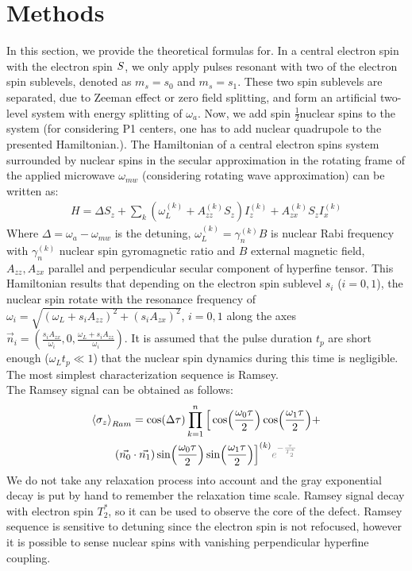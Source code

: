 \documentclass[%
 reprint,
superscriptaddress,
 amsmath,amssymb,
 aps,
]{revtex4-2}
\begin{document}
\section{Methods}
\label{sec:theory}
In this section, we provide the theoretical formulas for. In a central electron spin with the electron spin $\boldmath{S}$, we only apply pulses resonant with two of the electron spin sublevels, denoted as $m_s=s_0$ and $m_s = s_1$. These two spin sublevels are separated, due to Zeeman effect or zero field splitting, and form an artificial two-level system with energy splitting of $\omega_a$. Now, we add spin $\frac{1}{2}$nuclear spins to the system (for considering P1 centers, one has to add nuclear quadrupole to the presented Hamiltonian.). The Hamiltonian of a central electron spins system surrounded by nuclear spins in the secular approximation in the rotating frame of the applied microwave $\omega_{mw}$ (considering rotating wave approximation) can be written as:
\begin{align}
	H = \Delta S_z + \sum_k (\omega_L^{(k)}  + A_{zz}^{(k)} S_z) I_z^{(k)} + A_{zx}^{(k)} S_z I_x^{(k)}
	\label{eq:H}
\end{align}
Where $\Delta = \omega_a - \omega_{mw}$ is the detuning, $\omega_L^{(k)} =\gamma_n^{(k)} B$ is nuclear Rabi frequency with $\gamma_n^{(k)}$ nuclear spin gyromagnetic ratio and $B$ external magnetic field, $A_{zz}, A_{zx}$ parallel and perpendicular secular component of hyperfine tensor. This Hamiltonian results that depending on the electron spin sublevel $s_i$ ($i=0,1$), the nuclear spin rotate with the resonance frequency of $\omega_i = \sqrt{(\omega_L + s_i A_{zz})^2+ (s_i A_{zx})^2}$, $i=0,1$ along the axes $\vec{n}_i =(\frac{s_i A_{zx}}{\omega_i}, 0, \frac{\omega_L + s_i A_{zz}} {\omega_i})$. It is assumed that the pulse duration $t_p$ are short enough ($\omega_L t_p \ll 1$) that the nuclear spin dynamics during this time is negligible. The most simplest characterization sequence is Ramsey. \\ The Ramsey signal can be obtained as follows:
\begin{gather}
	\expval{\sigma_z}_{Ram} = \cos(\Delta \tau) \prod_{k=1}^{n} \Big[ \cos(\frac{\omega_0 \tau}{2}) \cos(\frac{\omega_1 \tau}{2})+ \notag \\
	(\vec{n_0}\cdot \vec{n_1})\sin(\frac{\omega_0 \tau}{2}) \sin(\frac{\omega_1 \tau}{2}) \Big]^{(k)}
	\textcolor{gray}{e^{-\frac{\tau}{T_2^\ast}}}
\end{gather} 
We do not take any relaxation process into account and the gray exponential decay is put by hand to remember the relaxation time scale. Ramsey signal decay with electron spin $T_2^\ast$, so it can be used to observe the core of the defect. Ramsey sequence is sensitive to detuning since the electron spin is not refocused, however it is possible to sense nuclear spins with vanishing perpendicular hyperfine coupling.\\
\end{document}
